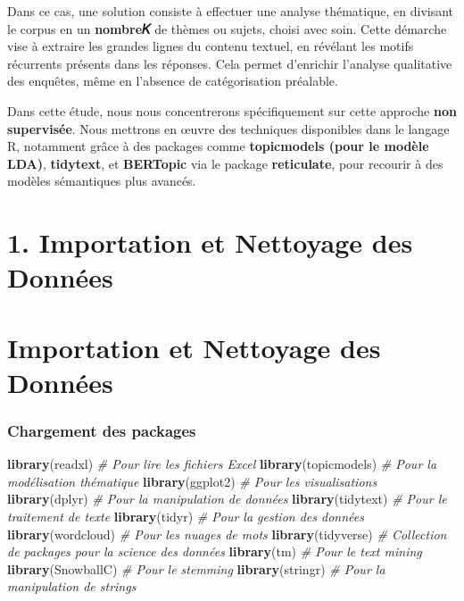 \documentclass[
]{article}
\newenvironment{Shaded}{\begin{snugshade}}{\end{snugshade}}
\newcommand{\CommentTok}[1]{\textcolor[rgb]{0.56,0.35,0.01}{\textit{#1}}}
\newcommand{\FunctionTok}[1]{\textcolor[rgb]{0.13,0.29,0.53}{\textbf{#1}}}
\newcommand{\NormalTok}[1]{#1}
\begin{document}
Dans ce cas, une solution consiste à effectuer une analyse thématique,
en divisant le corpus en un \textbf{nombre𝐾} de thèmes ou sujets, choisi
avec soin. Cette démarche vise à extraire les grandes lignes du contenu
textuel, en révélant les motifs récurrents présents dans les réponses.
Cela permet d'enrichir l'analyse qualitative des enquêtes, même en
l'absence de catégorisation préalable.

Dans cette étude, nous nous concentrerons spécifiquement sur cette
approche \textbf{non supervisée}. Nous mettrons en œuvre des techniques
disponibles dans le langage R, notamment grâce à des packages comme
\textbf{topicmodels (pour le modèle LDA)}, \textbf{tidytext}, et
\textbf{BERTopic} via le package \textbf{reticulate}, pour recourir à
des modèles sémantiques plus avancés.

\newpage

\section{1. Importation et Nettoyage des Données}\label{sec:importation}

\section{Importation et Nettoyage des Données}\label{sec-importation}

\subsubsection{Chargement des packages}\label{chargement-des-packages}

\begin{Shaded}
\begin{Highlighting}[]
\FunctionTok{library}\NormalTok{(readxl)       }\CommentTok{\# Pour lire les fichiers Excel}
\FunctionTok{library}\NormalTok{(topicmodels)  }\CommentTok{\# Pour la modélisation thématique}
\FunctionTok{library}\NormalTok{(ggplot2)      }\CommentTok{\# Pour les visualisations}
\FunctionTok{library}\NormalTok{(dplyr)        }\CommentTok{\# Pour la manipulation de données}
\FunctionTok{library}\NormalTok{(tidytext)     }\CommentTok{\# Pour le traitement de texte}
\FunctionTok{library}\NormalTok{(tidyr)        }\CommentTok{\# Pour la gestion des données}
\FunctionTok{library}\NormalTok{(wordcloud)    }\CommentTok{\# Pour les nuages de mots}
\FunctionTok{library}\NormalTok{(tidyverse)    }\CommentTok{\# Collection de packages pour la science des données}
\FunctionTok{library}\NormalTok{(tm)           }\CommentTok{\# Pour le text mining}
\FunctionTok{library}\NormalTok{(SnowballC)    }\CommentTok{\# Pour le stemming}
\FunctionTok{library}\NormalTok{(stringr)      }\CommentTok{\# Pour la manipulation de strings}
\end{Highlighting}
\end{Shaded}
\end{document}
